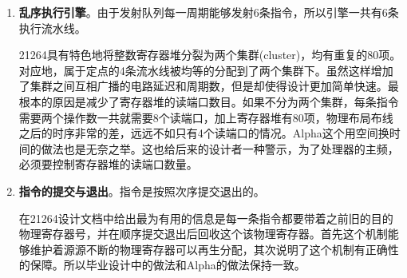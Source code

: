 \begin{enumerate}[label=(\alph*)]
	21264的取指宽度为4，也即一个周期最多能够取回4条指令。取回的指令先锁存一个周期，然后在CAM形式的重命名表中进行重命名和寄存器的分配。需要注意的是，和MIPS一样，Alpha在重命名阶段要特殊处理条件移动指令的映射关系。重命名完毕消除了写后写和读后写的冲突，但是依旧保留了写后读冲突。之后将指令写入发射队列中。发射队列采用分离式，分为定点指令队列和浮点指令队列，最多可以动态发射出六条指令，四条整数指令，两条浮点指令。使用记分牌来判断指令的操作数是否准备就绪。发射的细节上，微结构上有一个20项的定点队列和一个15项的浮点队列，队列只发射的是那些操作数都已经准备好的指令。与此同时，队列由仲裁器来决定填入新的指令。上述模块的逻辑可以由图\ref{fig:rename_21264}直观的描述。
	\begin{figure}[!htbp]
		\centering
		\texttt{[image: rename]}
		\label{fig:rename_21264}
	\end{figure}
	其中有一个Saved map state模块，非常重要，它的作用是在转移预测错误时恢复处理器的状态。注意该表有80项，也即每一条指令分配一项，这样处理器可以从任何一条指令之后精确地恢复状态，而不会受到跳转指令数量的约束。但是缺点是非常消耗资源。当然不光是转移预测错误的恢复，例外中断的状态恢复同样也是用这个表的，但和分支预测错误的恢复机制略有不同。
	\item \textbf{乱序执行引擎}。由于发射队列每一周期能够发射6条指令，所以引擎一共有6条执行流水线。
	
	21264具有特色地将整数寄存器堆分裂为两个集群(cluster)，均有重复的80项。对应地，属于定点的4条流水线被均等的分配到了两个集群下。虽然这样增加了集群之间互相广播的电路延迟和周期数，但是却使得设计更加简单快速。最根本的原因是减少了寄存器堆的读端口数目。如果不分为两个集群，每条指令需要两个操作数一共就需要8个读端口，加上寄存器堆有80项，物理布局布线之后的时序非常的差，远远不如只有4个读端口的情况。Alpha这个用空间换时间的做法也是无奈之举。这也给后来的设计者一种警示，为了处理器的主频，必须要控制寄存器堆的读端口数量。
	\item \textbf{指令的提交与退出}。指令是按照次序提交退出的。
	
	在21264设计文档中给出最为有用的信息是每一条指令都要带着之前旧的目的物理寄存器号，并在顺序提交退出后回收这个该物理寄存器。首先这个机制能够维护着源源不断的物理寄存器可以再生分配，其次说明了这个机制有正确性的保障。所以毕业设计中的做法和Alpha的做法保持一致。


\end{enumerate}
